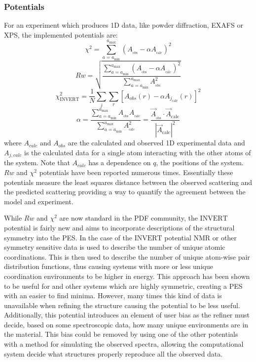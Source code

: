 \subsubsection{Potentials}
For an experiment which produces 1D data, like powder diffraction, EXAFS or XPS, the implemented potentials are:
\begin{equation} \label{chi}
\chi^{2} =
\sum_{a=a_\mathrm{min}}^{a_\mathrm{max}} \left(A_{_\mathrm{obs}} - \alpha A_{_\mathrm{calc}}\right)^{2}
\end{equation}
\begin{equation}\label{Rw}
Rw =
\sqrt{\frac{\sum_{a=a_\mathrm{min}}^{a_\mathrm{max}} \left(A_{_\mathrm{obs}} - \alpha A_{_\mathrm{calc}}\right)^{2}}{\sum_{a=a_\mathrm{min}}^{a_\mathrm{max}} A_{_\mathrm{obs}}^{2}}}
\end{equation}
\begin{equation}\label{INVERT}
  \chi^{2}_{\mathrm{INVERT}} = \frac{1}{N}\sum_{j}\sum_{r}[A_{obs}(r) - \alpha A_{j_\mathrm{calc}}(r)]^{2}
\end{equation}
\begin{equation} \label{alpha}
\alpha  = \frac{\sum_{a=a_\mathrm{min}}^{a_\mathrm{max}}A_\mathrm{_\mathrm{obs}}A_{_\mathrm{calc}}}{\sum_{a=a_\mathrm{min}}^{a_\mathrm{max}} A_{_\mathrm{calc}}^{2}} = \frac{\vec{A}_{_\mathrm{obs}}\cdot\vec{A}_\mathrm{calc}}{|\vec{A}_\mathrm{calc}|^{2}}
\end{equation}
where $A_{calc}$ and $A_{obs}$ are the calculated and observed 1D experimental data
and $A_{j, calc}$ is the calculated data for a single atom interacting with the
other atoms of the system.
Note that $A_{calc}$ has a dependence on $q$, the positions of the system.
$Rw$ and $\chi^{2}$ potentials have been reported numerous times. \cite{Petkov2014, Masadeh2007, Choi2013, McGreevy, Proffen1997}
Essentially these potentials measure the least squares distance between the observed scattering and the predicted scattering providing a way to quantify the agreement between the model and experiment.

While $Rw$ and $\chi^{2}$ are now standard in the PDF community, the $\mathrm{INVERT}$ potential is fairly new and aims to incorporate descriptions of the structural symmetry into the PES. \cite{Cliffe2010, Cliffe2013}
In the case of the $\mathrm{INVERT}$ potential NMR or other symmetry sensitive data is used to describe the number of unique atomic coordinations.
This is then used to describe the number of unique atom-wise pair distribution functions, thus causing systems with more or less unique coordination environments to be higher in energy.
This approach has been shown to be useful for  and other systems which are highly symmetric, creating a PES with an easier to find minima. \cite{Cliffe2010, Cliffe2013}
However, many times this kind of data is unavailable when refining the structure causing the potential to be less useful.
Additionally, this potential introduces an element of user bias as the refiner must decide, based on some spectroscopic data, how many unique environments are in the material.
This bias could be removed by using one of the other potentials with a method for simulating the observed spectra, allowing the computational system decide what structures properly reproduce all the observed data.

